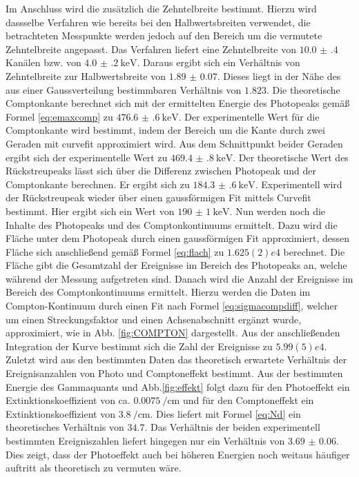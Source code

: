Im Anschluss wird die zusätzlich die Zehntelbreite bestimmt. Hierzu wird dassselbe Verfahren wie bereits bei den Halbwertsbreiten verwendet, die betrachteten Messpunkte werden jedoch auf den Bereich um die vermutete Zehntelbreite angepasst. Das Verfahren liefert eine Zehntelbreite von $\num{10.0(4)}$ Kanälen bzw. von $\SI{4.0(2)}{\kilo\electronvolt}$. Daraus ergibt sich ein Verhältnis von Zehntelbreite zur Halbwertsbreite von $\num{1.89(7)}$. Dieses liegt in der Nähe des aus einer Gaussverteilung bestimmbaren Verhältnis von $\num{1.823}$\cite{V18}. Die theoretische Comptonkante berechnet sich mit der ermittelten Energie des Photopeaks gemäß Formel \eqref{eq:emaxcomp} zu $\SI{476.6(6)}{\kilo\electronvolt}$. Der experimentelle Wert für die Comptonkante wird bestimmt, indem der Bereich um die Kante durch zwei Geraden mit curvefit\cite{V18} approximiert wird. Aus dem Schnittpunkt beider Geraden ergibt sich der experimentelle Wert zu $\SI{469.4(8)}{\kilo\electronvolt}$. Der theoretische Wert des Rückstreupeaks lässt sich über die Differenz zwischen Photopeak und der Comptonkante berechnen. Er ergibt sich zu $\SI{184.3(6)}{\kilo\electronvolt}$. Experimentell wird der Rückstreupeak wieder über einen gaussförmigen Fit mittels Curvefit bestimmt. Hier ergibt sich ein Wert von $\SI{190(1)}{\kilo\electronvolt}$. Nun werden noch die Inhalte des Photopeaks und des Comptonkontinuums ermittelt. Dazu wird die Fläche unter dem Photopeak durch einen gaussförmigen Fit approximiert, dessen Fläche sich anschließend gemäß Formel \eqref{eq:flach} zu $\si{1.625(2)e4}$ berechnet. Die Fläche gibt die Gesamtzahl der Ereignisse im Bereich des Photopeaks an, welche während der Messung aufgetreten sind. Danach wird die Anzahl der Ereignisse im Bereich des Comptonkontinuums ermittelt. Hierzu werden die Daten im Compton-Kontinuum durch einen Fit nach Formel \eqref{eq:sigmacompdiff}, welcher um einen Streckungsfaktor und einen Achsenabschnitt ergänzt wurde, approximiert, wie in Abb. \ref{fig:COMPTON} dargestellt. Aus der anschließenden Integration der Kurve bestimmt sich die Zahl der Ereignisse zu $\si{5.99(5)e4}$. Zuletzt wird aus den bestimmten Daten das theoretisch erwartete Verhältnis der Ereignisanzahlen von Photo und Comptoneffekt bestimmt. Aus der bestimmten Energie des Gammaquants und Abb.\ref{fig:effekt} folgt dazu für den Photoeffekt ein Extinktionskoeffizient von ca. $\SI{0.0075}{\per\centi\meter}$ und für den Comptoneffekt ein Extinktionskoeffizient von $\SI{3.8}{\per\centi\meter}$. Dies liefert mit Formel \eqref{eq:Nd} ein theoretisches Verhältnis von $34.7$. Das Verhältnis der beiden experimentell bestimmten Ereigniszahlen liefert hingegen nur ein Verhältnis von $\num{3.69(6)}$. Dies zeigt, dass der Photoeffekt auch bei höheren Energien noch weitaus häufiger auftritt als theoretisch zu vermuten wäre. 







